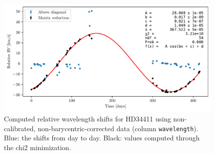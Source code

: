     \begin{figure}%
        \begin{wide}  
            \includegraphics[width=\textwidth]{figures/shift_non_bary_centric.pdf}
            \caption{Computed relative wavelength shifts for HD34411 using non-calibrated, non-barycentric-corrected data (column \texttt{wavelength}). Blue: the shifts from day to day. Black: values computed through the chi2 minimization.}
            \label{fig:RV_results_non_barycentric}
        \end{wide}
    \end{figure}




